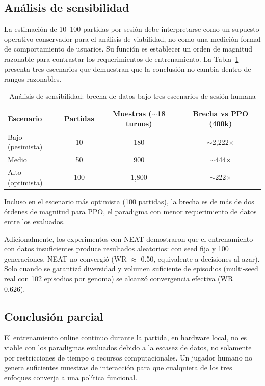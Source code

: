 \subsection{Análisis de sensibilidad}

La estimación de 10--100 partidas por sesión debe interpretarse como un supuesto operativo conservador para el análisis de viabilidad, no como una medición formal de comportamiento de usuarios. Su función es establecer un orden de magnitud razonable para contrastar los requerimientos de entrenamiento. La Tabla~\ref{tab:sensibilidad} presenta tres escenarios que demuestran que la conclusión no cambia dentro de rangos razonables.

\begin{table}[H]
\centering
\caption{Análisis de sensibilidad: brecha de datos bajo tres escenarios de sesión humana}
\begin{tabular}{lccc}
\hline
\textbf{Escenario} & \textbf{Partidas} & \textbf{Muestras ($\sim$18 turnos)} & \textbf{Brecha vs PPO (400k)} \\
\hline
Bajo (pesimista)  & 10  & 180   & $\sim$2,222$\times$ \\
Medio             & 50  & 900   & $\sim$444$\times$ \\
Alto (optimista)  & 100 & 1,800 & $\sim$222$\times$ \\
\hline
\end{tabular}
\label{tab:sensibilidad}
\end{table}

Incluso en el escenario más optimista (100 partidas), la brecha es de más de dos órdenes de magnitud para PPO, el paradigma con menor requerimiento de datos entre los evaluados.

Adicionalmente, los experimentos con NEAT demostraron que el entrenamiento con datos insuficientes produce resultados aleatorios: con seed fija y 100 generaciones, NEAT no convergió (WR $\approx$ 0.50, equivalente a decisiones al azar). Solo cuando se garantizó diversidad y volumen suficiente de episodios (multi-seed real con 102 episodios por genoma) se alcanzó convergencia efectiva (WR = 0.626).

\subsection{Conclusión parcial}

El entrenamiento online continuo durante la partida, en hardware local, no es viable con los paradigmas evaluados debido a la escasez de datos, no solamente por restricciones de tiempo o recursos computacionales. Un jugador humano no genera suficientes muestras de interacción para que cualquiera de los tres enfoques converja a una política funcional.


